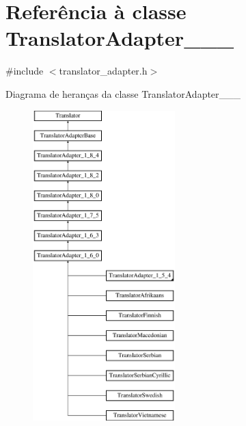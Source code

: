 \hypertarget{class_translator_adapter__1__6__3}{\section{Referência à classe Translator\-Adapter\-\_\-\_\-\_}
\label{class_translator_adapter__1__6__3}
}


{\ttfamily \#include $<$translator\-\_\-adapter.\-h$>$}

Diagrama de heranças da classe Translator\-Adapter\-\_\-\_\-\_\begin{figure}[H]
\begin{center}
\leavevmode
\includegraphics[height=12.000000cm]{class_translator_adapter__1__6__3}
\end{center}
\end{figure}
